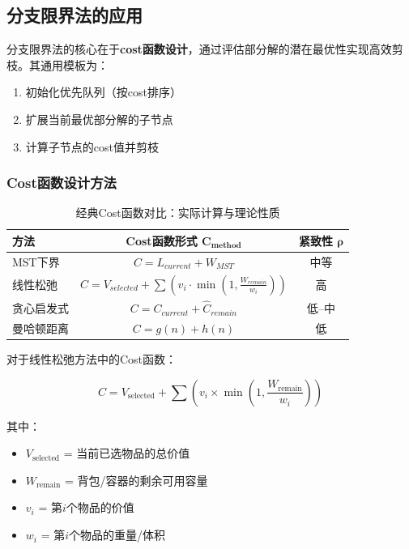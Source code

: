 \documentclass[./../main.tex]{subfiles}
\begin{document}
\subsection{分支限界法的应用}
分支限界法的核心在于\textbf{cost函数设计}，通过评估部分解的潜在最优性实现高效剪枝。其通用模板为：
\begin{enumerate}
    \item 初始化优先队列（按cost排序）
    \item 扩展当前最优部分解的子节点
    \item 计算子节点的cost值并剪枝
\end{enumerate}

\subsubsection{Cost函数设计方法}
\begin{table}[h]
\centering
\caption{经典Cost函数对比：实际计算与理论性质}
\begin{tabular}{lcc}
\toprule
\textbf{方法} & \textbf{Cost函数形式 }$\boldsymbol{C_{method}}$ & \textbf{紧致性 }$\boldsymbol{\rho}$ \\
\midrule
MST下界 & $C = L_{current} + W_{MST}$ & 中等 \\
线性松弛 & $C = V_{selected} + \sum \left(v_i \cdot \min\left(1,\frac{W_{remain}}{w_i}\right)\right)$ & 高 \\
贪心启发式 & $C = C_{current} + \widehat{C}_{remain}$ & 低--中 \\
曼哈顿距离 & $C = g(n) + h(n)$ & 低 \\
\bottomrule
\end{tabular}
\end{table}

对于线性松弛方法中的Cost函数：

\begin{equation*}
C = V_{\text{selected}} + \sum \left(v_i \times \min\left(1,\frac{W_{\text{remain}}}{w_i}\right)\right)
\end{equation*}

其中：
\begin{itemize}
    \item $V_{\text{selected}}$ = 当前已选物品的总价值
    \item $W_{\text{remain}}$ = 背包/容器的剩余可用容量
    \item $v_i$ = 第$i$个物品的价值
    \item $w_i$ = 第$i$个物品的重量/体积
\end{itemize}
\end{document}
